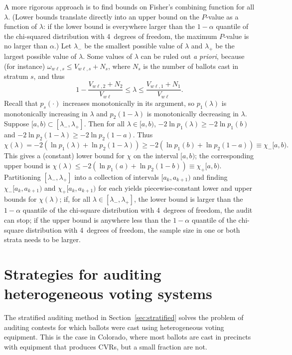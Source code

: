 \documentclass[runningheads]{llncs}
\newcommand{\beq}{\begin{equation}}
\newcommand{\eeq}{\end{equation}}
\begin{document}
A more rigorous approach is to find bounds on Fisher's combining function for all
$\lambda$. 
(Lower bounds translate directly into an upper bound on the $P$-value as a function of
$\lambda$: if the lower bound is 
everywhere larger than the $1-\alpha$ quantile of the chi-squared distribution with 4~degrees of freedom, the maximum $P$-value is no larger than $\alpha$.)
Let $\lambda_-$ be the smallest possible value of $\lambda$ and $\lambda_+$ be the largest
possible value of $\lambda$.
Some values of $\lambda$ can be ruled out \emph{a priori}, because (for instance) $\omega_{w\ell,s} \le
V_{w\ell,s}+N_s$,
where $N_s$ is the number of ballots cast in stratum $s$, and thus
\beq
   1 - \frac{V_{w\ell,2}+N_2}{V_{w\ell}} \le \lambda \le \frac{V_{w\ell,1}+N_1}{V_{w\ell}}.
\eeq
Recall that $p_s(\cdot)$ increases monotonically in its argument, so $p_1(\lambda)$ is
monotonically increasing in $\lambda$ and $p_2(1-\lambda)$ is monotonically decreasing in $\lambda$.
Suppose $[a, b) \subset [\lambda_-, \lambda_+]$.
Then for all $\lambda \in [a, b)$, $-2\ln p_1(\lambda) \ge -2\ln p_1(b)$ and
$-2\ln p_2(1-\lambda) \ge -2\ln p_2(1-a)$.
Thus
\beq
   \chi(\lambda) = -2(\ln p_1(\lambda)+ \ln p_2(1-\lambda))
          \ge -2(\ln p_1(b) + \ln p_2(1-a)) \equiv \chi_-[a,b).
\eeq
This gives a (constant) lower bound for $\chi$ on the interval $[a, b)$; the corresponding 
upper bound is $\chi(\lambda) \le -2(\ln p_1(a) + \ln p_2(1-b)) \equiv \chi_+[a,b)$.
Partitioning $[\lambda_-, \lambda_+]$ into a collection of intervals $[a_k, a_{k+1})$
and finding $\chi_-[a_k, a_{k+1})$ and $\chi_+[a_k, a_{k+1})$ for each
yields piecewise-constant lower and upper bounds for $\chi(\lambda)$; if,
 for all $\lambda \in [\lambda_-, \lambda_+]$, the lower bound
is larger than the $1-\alpha$ quantile of the chi-square distribution with 4~degrees of freedom,
the audit can stop; if the upper bound is anywhere less than the $1-\alpha$ quantile of the chi-square distribution with 4~degrees of freedom, the sample size in one or both strata needs to be larger.



\section{Strategies for auditing heterogeneous voting systems}\label{sec:combiningMethods}
The stratified auditing method in Section~\ref{sec:stratified} solves the problem of auditing contests
for which ballots were cast using heterogeneous voting equipment.
This is the case in Colorado, where most ballots are cast in precincts with equipment that produces CVRs,
but a small fraction are not.
\end{document}
